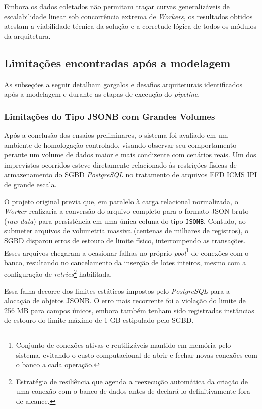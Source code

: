 Embora os dados coletados não permitam traçar curvas generalizáveis de
escalabilidade linear sob concorrência extrema de \textit{Workers}, os
resultados obtidos atestam a viabilidade técnica da solução e a corretude
lógica de todos os módulos da arquitetura.

\subsection{Limitações encontradas após a modelagem}
\label{sec:limitacoes}

As subseções a seguir detalham gargalos e desafios arquiteturais identificados
após a modelagem e durante as etapas de execução do \textit{pipeline}.

\subsubsection{Limitações do Tipo JSONB com Grandes Volumes}
\label{sec:json_grande}
Após a conclusão dos ensaios preliminares, o sistema foi avaliado em um
ambiente de homologação controlado, visando observar seu comportamento
perante um volume de dados maior e mais condizente com cenários reais.
Um dos imprevistos ocorridos esteve diretamente relacionado às restrições
físicas de armazenamento do SGBD \textit{PostgreSQL} no tratamento de
arquivos EFD ICMS IPI de grande escala. 

O projeto original previa que, em paralelo à carga relacional normalizada, o
\textit{Worker} realizaria a conversão do arquivo completo para o
formato JSON bruto (\textit{raw data}) para persistência em uma única
coluna do tipo \texttt{JSONB}. Contudo, ao submeter arquivos de
volumetria massiva (centenas de milhares de registros), o SGBD disparou
erros de estouro de limite físico, interrompendo as transações. Esses
arquivos chegaram a ocasionar falhas no próprio \textit{pool}\footnote{Conjunto
de conexões ativas e reutilizáveis mantido em memória pelo sistema, evitando
o custo computacional de abrir e fechar novas conexões com o banco a cada
operação.} de conexões com o banco, resultando no cancelamento da inserção de
lotes inteiros, mesmo com a configuração de \textit{retries}\footnote{Estratégia
de resiliência que agenda a reexecução automática da criação de uma conexão com
o banco de dados antes de declará-lo definitivamente fora de alcance.}
habilitada.

Essa falha decorre dos limites estáticos impostos pelo \textit{PostgreSQL}
para a alocação de objetos JSONB. O erro mais recorrente foi a violação
do limite de 256 MB para campos únicos, embora também tenham sido registradas
instâncias de estouro do limite máximo de 1 GB estipulado pelo SGBD.

